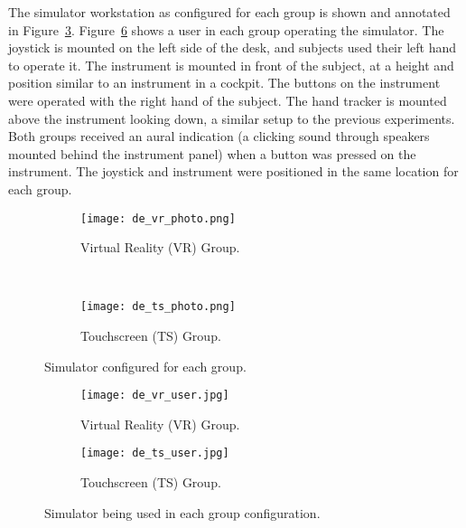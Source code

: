 The simulator workstation as configured for each group is shown and annotated in Figure~\ref{fig:de_simgroups}.
Figure~\ref{fig:de_userpic} shows a user in each group operating the simulator.
The joystick is mounted on the left side of the desk, and subjects used their left hand to operate it.
The instrument is mounted in front of the subject, at a height and position similar to an instrument in a cockpit.
The buttons on the instrument were operated with the right hand of the subject.
The hand tracker is mounted above the instrument looking down, a similar setup to the previous experiments.
Both groups received an aural indication (a clicking sound through speakers mounted behind the instrument panel) when a button was pressed on the instrument.
The joystick and instrument were positioned in the same location for each group.

\begin{figure}
    \centering
    \begin{subfigure}[t]{0.95\linewidth}
        \centering
        \texttt{[image: de\_vr\_photo.png]}
        \caption{Virtual Reality (VR) Group.}
        \label{fig:de_simgroups:vr}
    \end{subfigure}\\
    \begin{subfigure}[t]{0.95\linewidth}
        \centering
        \texttt{[image: de\_ts\_photo.png]}
        \caption{Touchscreen (TS) Group.}
        \label{fig:de_simgroups:ts}
    \end{subfigure}
    \caption{Simulator configured for each group.}
    \label{fig:de_simgroups}
\end{figure}

\begin{figure}
    \centering
    \begin{subfigure}[t]{0.95\linewidth}
        \centering
        \texttt{[image: de\_vr\_user.jpg]}
        \caption{Virtual Reality (VR) Group.}
        \label{fig:de_userpic:vr}
    \end{subfigure}
    \begin{subfigure}[t]{0.95\linewidth}
        \centering
        \texttt{[image: de\_ts\_user.jpg]}
        \caption{Touchscreen (TS) Group.}
        \label{fig:de_userpic:ts}
    \end{subfigure}
    \caption{Simulator being used in each group configuration.}
    \label{fig:de_userpic}
\end{figure}

